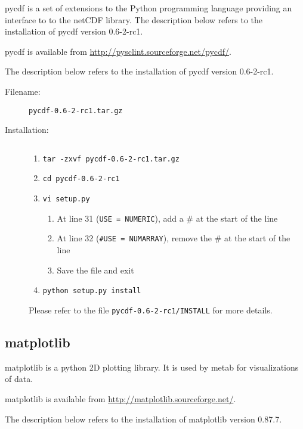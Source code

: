 pycdf is a set of extensions to the Python programming language
providing an interface to to the netCDF library. The description
below refers to the installation of pycdf version 0.6-2-rc1.

pycdf is available from \url{http://pysclint.sourceforge.net/pycdf/}.

The description below refers to the installation of pycdf version
0.6-2-rc1.

\begin{description}
\item [Filename:] {\tt pycdf-0.6-2-rc1.tar.gz}
\item [Installation:] $ $
  \begin{enumerate}
  \item {\tt tar -zxvf pycdf-0.6-2-rc1.tar.gz}
  \item {\tt cd pycdf-0.6-2-rc1}
  \item {\tt vi setup.py}
    \begin{enumerate}
    \item At line 31 ({\tt USE = NUMERIC}), add a \# at the start of the line
    \item At line 32 ({\tt \#USE = NUMARRAY}), remove the \# at the start
    of the line
    \item Save the file and exit
    \end{enumerate}
  \item {\tt python setup.py install}
  \end{enumerate}
Please refer to the file {\tt pycdf-0.6-2-rc1/INSTALL} for more details.
\end{description}

\subsection{matplotlib}

matplotlib is a python 2D plotting library.  It is used by metab for 
visualizations of data.

matplotlib is available from \url{http://matplotlib.sourceforge.net/}.

The description below refers to the installation of matplotlib version
0.87.7.

